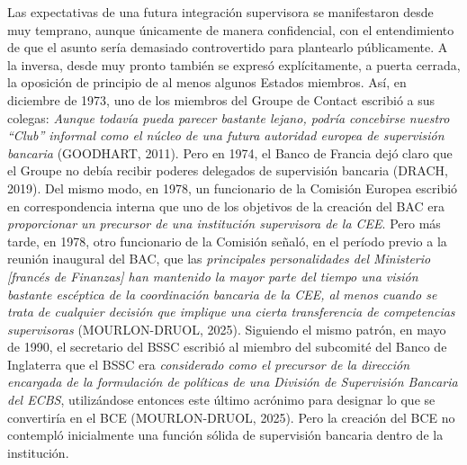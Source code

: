 \documentclass[10pt,a4paper]{article}
\begin{document}
{Las expectativas de una futura integración supervisora se manifestaron desde muy temprano, aunque únicamente de manera confidencial, con el entendimiento de que el asunto sería demasiado controvertido para plantearlo públicamente. A la inversa, desde muy pronto también se expresó explícitamente, a puerta cerrada, la oposición de principio de al menos algunos Estados miembros. Así, en diciembre de 1973, uno de los miembros del Groupe de Contact escribió a sus colegas: \textit{Aunque todavía pueda parecer bastante lejano, podría concebirse nuestro “Club” informal como el núcleo de una futura autoridad europea de supervisión bancaria} (GOODHART, 2011). Pero en 1974, el Banco de Francia dejó claro que el Groupe no debía recibir poderes delegados de supervisión bancaria (DRACH, 2019). Del mismo modo, en 1978, un funcionario de la Comisión Europea escribió en correspondencia interna que uno de los objetivos de la creación del BAC era \textit{proporcionar un precursor de una institución supervisora de la CEE}. Pero más tarde, en 1978, otro funcionario de la Comisión señaló, en el período previo a la reunión inaugural del BAC, que las \textit{principales personalidades del Ministerio [francés de Finanzas] han mantenido la mayor parte del tiempo una visión bastante escéptica de la coordinación bancaria de la CEE, al menos cuando se trata de cualquier decisión que implique una cierta transferencia de competencias supervisoras} (MOURLON-DRUOL, 2025). Siguiendo el mismo patrón, en mayo de 1990, el secretario del BSSC escribió al miembro del subcomité del Banco de Inglaterra que el BSSC era \textit{considerado como el precursor de la dirección encargada de la formulación de políticas de una División de Supervisión Bancaria del ECBS}, utilizándose entonces este último acrónimo para designar lo que se convertiría en el BCE (MOURLON-DRUOL, 2025). Pero la creación del BCE no contempló inicialmente una función sólida de supervisión bancaria dentro de la institución.

}
\end{document}

